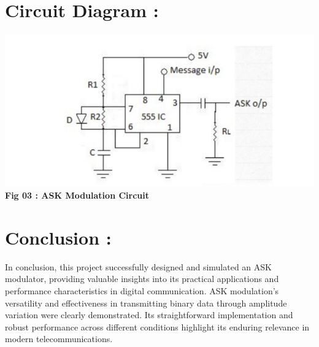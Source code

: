 \documentclass[12pt,a4paper]{article}
\begin{document}
\section*{Circuit Diagram :}
\begin{center}
    \includegraphics[width=1.0\textwidth]{ckt.png}
    \newline
    \textbf {Fig 03 : ASK Modulation Circuit}
\end{center}



\section*{Conclusion :}

In conclusion, this project successfully designed and simulated an ASK modulator, providing valuable insights into its practical applications and performance characteristics in digital communication. ASK modulation's versatility and effectiveness in transmitting binary data through amplitude variation were clearly demonstrated. Its straightforward implementation and robust performance across different conditions highlight its enduring relevance in modern telecommunications.
\end{document}
